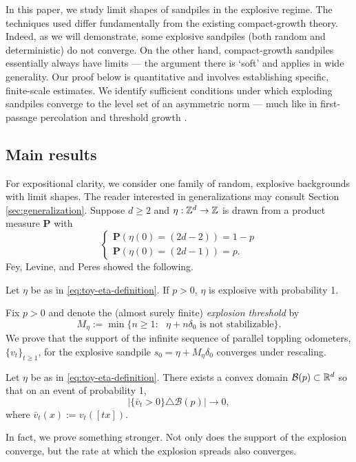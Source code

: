 \documentclass[12pt]{amsart}
\begin{document}
In this paper, we study limit shapes of sandpiles in the explosive regime. The techniques used differ fundamentally from the existing compact-growth theory. Indeed, as we will demonstrate, some explosive sandpiles (both random and deterministic) do not converge. On the other hand, compact-growth sandpiles essentially always have limits --- the argument there is `soft' and applies in wide generality. Our proof below is quantitative and involves establishing specific, finite-scale estimates. We identify sufficient conditions under which exploding sandpiles converge to the level set of an asymmetric norm  --- much like in first-passage percolation  \cite{cox1981some} and threshold growth \cite{willson1978convergence, gravner1993threshold}.


\subsection{Main results}	
For expositional clarity, we consider one family of random, explosive backgrounds with limit shapes. The reader interested in generalizations may consult Section \ref{sec:generalization}. Suppose $d \geq 2$ and $\eta:\mathbb{Z}^d \to \mathbb{Z}$ is drawn from a product measure $\mathbf{P}$ with
\begin{equation} \label{eq:toy-eta-definition}
\begin{cases}
\mathbf{P}(\eta(0) = (2 d - 2)) = 1-p \\
\mathbf{P}(\eta(0) = (2 d - 1)) = p.
\end{cases}
\end{equation}
Fey, Levine, and Peres showed the following.
\begin{theorem}\label{prop:fey_levine_peres_explode}
	Let $\eta$ be as in \eqref{eq:toy-eta-definition}.  If $p > 0$, $\eta$ is explosive with probability 1. 
\end{theorem}
Fix $p > 0$ and denote the (almost surely finite) {\it explosion threshold} by
\begin{equation} \label{eq:first_explosion}
M_{\eta} :=  \min\{ n \geq 1 : \mbox{ $\eta + n  \delta_0$ is not stabilizable} \}. 
\end{equation} 
We prove that the support of the infinite sequence of parallel toppling odometers, $\{v_t\}_{t \geq 1}$, for the explosive sandpile $s_0 = \eta + M_{\eta}  \delta_0$ converges under rescaling. 
\begin{theorem} \label{theorem:limit_shape}
	Let $\eta$ be as in \eqref{eq:toy-eta-definition}. 
	There exists a convex domain $\mathcal{B}(p) \subset \mathbb{R}^d$ so that on an event of 
	probability 1, 
	\[
	| \{ \bar{v}_t > 0\} \triangle \mathcal{B}(p)| \to 0, 
	\]
	where $\bar{v}_t(x) := v_t([t x])$. 
\end{theorem}
In fact, we prove something stronger. Not only does the support of the explosion converge, 
but the rate at which the explosion spreads also converges. 
\end{document}
